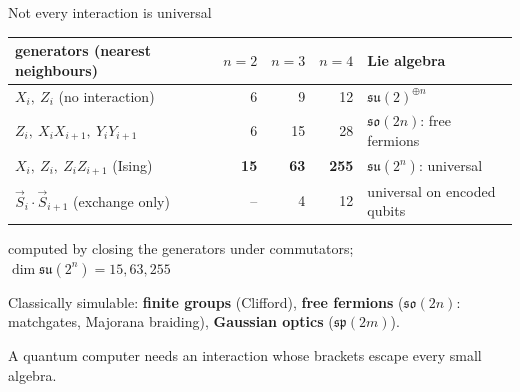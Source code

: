 \documentclass[aspectratio=169,11pt]{beamer}
\newcommand{\su}{\mathfrak{su}}
\newcommand{\so}{\mathfrak{so}}
\begin{document}
\begin{frame}{Not every interaction is universal}
  \centering\small
  \renewcommand{\arraystretch}{1.2}
  \begin{tabular}{@{}lrrrl@{}}
    \toprule
    generators (nearest neighbours) & $n=2$ & $n=3$ & $n=4$ & Lie algebra \\
    \midrule
    $X_i,\ Z_i$ (no interaction) & 6 & 9 & 12 & $\su(2)^{\oplus n}$ \\
    $Z_i,\ X_iX_{i+1},\ Y_iY_{i+1}$ & 6 & 15 & 28 & $\so(2n)$: free fermions \\
    $X_i,\ Z_i,\ Z_iZ_{i+1}$ (Ising) & \textbf{15} & \textbf{63} & \textbf{255} & $\su(2^n)$: universal \\
    $\vec S_i\cdot\vec S_{i+1}$ (exchange only) & -- & 4 & 12 & universal on encoded qubits \\
    \bottomrule
  \end{tabular}\par
  {\footnotesize\color{subtle}computed by closing the generators under commutators; $\dim\su(2^n)=15,63,255$}
  \vskip2mm
  \raggedright\normalsize
  Classically simulable: \textbf{finite groups} (Clifford), \textbf{free fermions} ($\so(2n)$: matchgates, Majorana braiding), \textbf{Gaussian optics} ($\mathfrak{sp}(2m)$).
  \begin{takeaway}A quantum computer needs an interaction whose brackets escape every small algebra.\end{takeaway}
\end{frame}
\end{document}

